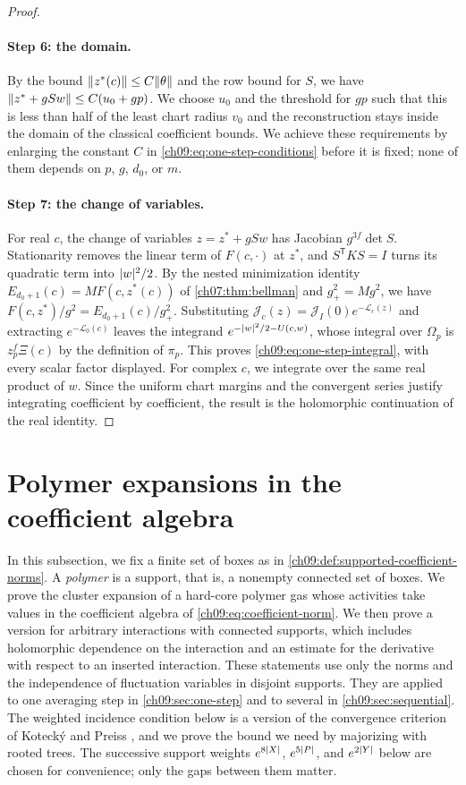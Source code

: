 \begin{proof}
\paragraph{Step 6: the domain.}
By the bound $\lVert z^*(c)\rVert\le C\lVert \theta\rVert$ and the row bound for $S$, we have $\lVert z^*+gSw\rVert\le C(u_0+gp)$. We choose $u_0$ and the threshold for $gp$ such that this is less than half of the least chart radius $v_0$ and the reconstruction stays inside the domain of the classical coefficient bounds. We achieve these requirements by enlarging the constant $C$ in \eqref{ch09:eq:one-step-conditions} before it is fixed; none of them depends on $p$, $g$, $d_0$, or $m$.

\paragraph{Step 7: the change of variables.}
For real $c$, the change of variables $z=z^*+gSw$ has Jacobian $g^{3f}\det S$. Stationarity removes the linear term of $F(c,\cdot)$ at $z^*$, and $S^{\mathsf T}KS=I$ turns its quadratic term into $\lvert w\rvert^2/2$. By the nested minimization identity $E_{d_0+1}(c)=MF(c,z^*(c))$ of \cref{ch07:thm:bellman} and $g_+^2=Mg^2$, we have $F(c,z^*)/g^2=E_{d_0+1}(c)/g_+^2$. Substituting $\mathcal J_c(z)=\mathcal J_I(0)e^{-\mathcal L_c(z)}$ and extracting $e^{-\mathcal L_0(c)}$ leaves the integrand $e^{-\lvert w\rvert^2/2-U(c,w)}$, whose integral over $\Omega_p$ is $z_p^f\Xi(c)$ by the definition of $\pi_p$. This proves \eqref{ch09:eq:one-step-integral}, with every scalar factor displayed. For complex $c$, we integrate over the same real product of $w$. Since the uniform chart margins and the convergent series justify integrating coefficient by coefficient, the result is the holomorphic continuation of the real identity.
\end{proof}

\section{Polymer expansions in the coefficient algebra}\label{ch09:sec:polymers}

In this subsection, we fix a finite set of boxes as in \cref{ch09:def:supported-coefficient-norms}. A \emph{polymer} is a support, that is, a nonempty connected set of boxes. We prove the cluster expansion of a hard-core polymer gas whose activities take values in the coefficient algebra of \eqref{ch09:eq:coefficient-norm}. We then prove a version for arbitrary interactions with connected supports, which includes holomorphic dependence on the interaction and an estimate for the derivative with respect to an inserted interaction. These statements use only the norms and the independence of fluctuation variables in disjoint supports. They are applied to one averaging step in \cref{ch09:sec:one-step} and to several in \cref{ch09:sec:sequential}. The weighted incidence condition below is a version of the convergence criterion of Kotecký and Preiss \cite{KoteckyPreiss1986}, and we prove the bound we need by majorizing with rooted trees. The successive support weights $e^{8\lvert X\rvert}$, $e^{5\lvert P\rvert}$, and $e^{2\lvert Y\rvert}$ below are chosen for convenience; only the gaps between them matter.

